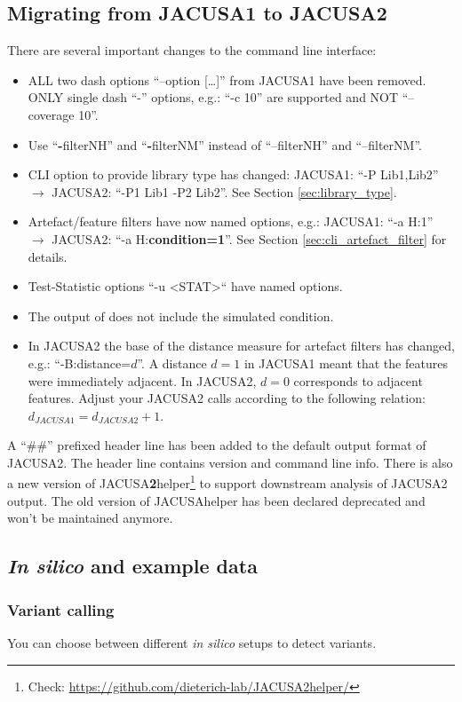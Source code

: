 \documentclass[10pt,a4paper,final]{article}
\begin{document}
\subsection{Migrating from JACUSA1 to JACUSA2}\label{sec:migration}
There are several important changes to the command line interface:
\begin{itemize}
  \item ALL two dash options ``--option [\ldots]'' from JACUSA1 have been removed. ONLY single dash 
  ``-'' options, e.g.: ``-c 10'' are supported and NOT ``--coverage 10''.
  \item Use ``\textbf{-}filterNH'' and ``\textbf{-}filterNM'' instead of ``--filterNH'' and
  ``--filterNM''.
  \item CLI option to provide library type has changed: JACUSA1: ``-P Lib1,Lib2'' $\rightarrow$
  JACUSA2: ``-P1 Lib1 -P2 Lib2''. See Section \ref{sec:library_type}.
  \item Artefact/feature filters have now named options, e.g.: JACUSA1: ``-a H:1'' $\rightarrow$
  JACUSA2: ``-a H:\textbf{condition=1}''. See Section \ref{sec:cli_artefact_filter} for details.
  \item Test-Statistic options ``-u <STAT>`` have named options.
  \item The output of  does not include the simulated condition.
  \item In JACUSA2 the base of the distance measure for artefact filters has changed, e.g.: ``-B:distance=$d$''.
   A distance $d=1$ in JACUSA1 meant that the features were immediately adjacent. In JACUSA2, 
   $d=0$ corresponds to adjacent features. Adjust your JACUSA2 calls according to the following 
   relation: $d_{JACUSA1} = d_{JACUSA2} +1 $.
\end{itemize}
A ``\#\#'' prefixed header line has been added to the default output format of JACUSA2. The header
line contains version and command line info.
There is also a new version of JACUSA\textbf{2}helper\footnote{Check: 
\url{https://github.com/dieterich-lab/JACUSA2helper/}} to support downstream
analysis of JACUSA2 output. The old version of JACUSAhelper has been declared deprecated and won't be maintained
anymore.
\subsection{\textit{In silico} and example data}
\subsubsection{Variant calling}
You can choose between different \textit{in silico} setups to detect variants. 
\end{document}
